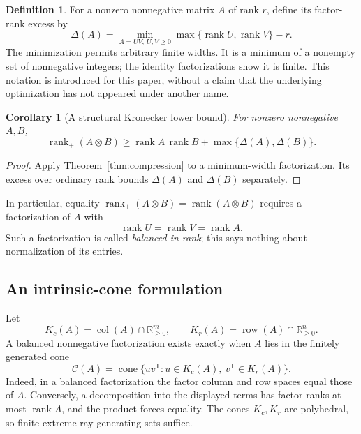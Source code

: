 \documentclass[11pt]{article}
\newtheorem{corollary}[theorem]{Corollary}
\theoremstyle{definition}\newtheorem{definition}[theorem]{Definition}
\theoremstyle{remark}\newtheorem{remark}[theorem]{Remark}
\newcommand{\rk}{\operatorname{rank}}
\newcommand{\rp}{\operatorname{rank}_{+}}
\newcommand{\col}{\operatorname{col}}
\newcommand{\row}{\operatorname{row}}
\newcommand{\R}{\mathbb R}
\begin{document}
\begin{definition}
For a nonzero nonnegative matrix $A$ of rank $r$, define its factor-rank excess by
\[
\Delta(A)=\min_{A=UV,\ U,V\ge0}\max\{\rk U,\rk V\}-r.
\]
The minimization permits arbitrary finite widths. It is a minimum of a nonempty set of nonnegative integers; the identity factorizations show it is finite. This notation is introduced for this paper, without a claim that the underlying optimization has not appeared under another name.
\end{definition}

\begin{corollary}[A structural Kronecker lower bound]\label{cor:lower}
For nonzero nonnegative $A,B$,
\begin{equation}\label{eq:lower}
\rp(A\otimes B)\ge\rk A\,\rk B+\max\{\Delta(A),\Delta(B)\}.
\end{equation}
\end{corollary}
\begin{proof}
Apply Theorem~\ref{thm:compression} to a minimum-width factorization. Its excess over ordinary rank bounds $\Delta(A)$ and $\Delta(B)$ separately.
\end{proof}

In particular, equality $\rp(A\otimes B)=\rk(A\otimes B)$ requires a factorization of $A$ with
\begin{equation}\label{eq:balanced}
\rk U=\rk V=\rk A.
\end{equation}
Such a factorization is called \emph{balanced in rank}; this says nothing about normalization of its entries.

\subsection{An intrinsic-cone formulation}
Let
\[
K_c(A)=\col(A)\cap\R^m_{\ge0},\qquad
K_r(A)=\row(A)\cap\R^n_{\ge0}.
\]
A balanced nonnegative factorization exists exactly when $A$ lies in the finitely generated cone
\begin{equation}\label{eq:intrinsiccone}
\mathcal C(A)=\operatorname{cone}\{uv^{\mathsf T}:u\in K_c(A),\ v^{\mathsf T}\in K_r(A)\}.
\end{equation}
Indeed, in a balanced factorization the factor column and row spaces equal those of $A$. Conversely, a decomposition into the displayed terms has factor ranks at most $\rk A$, and the product forces equality. The cones $K_c,K_r$ are polyhedral, so finite extreme-ray generating sets suffice.
\end{document}
